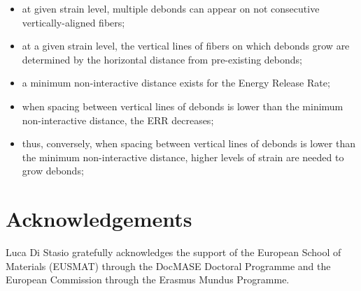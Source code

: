\documentclass[review]{elsarticle}
\begin{document}
\begin{itemize}
\item at given strain level, multiple debonds can appear on not consecutive vertically-aligned fibers;
\item at a given strain level, the vertical lines of fibers on which debonds grow are determined by the horizontal distance from pre-existing debonds;
\item a minimum non-interactive distance exists for the Energy Release Rate;
\item when spacing between vertical lines of debonds is lower than the minimum non-interactive distance, the ERR decreases;
\item thus, conversely, when spacing between vertical lines of debonds is lower than the minimum non-interactive distance, higher levels of strain are needed to grow debonds;
\end{itemize}


\section*{Acknowledgements}

Luca Di Stasio gratefully acknowledges the support of the European School of Materials (EUSMAT) through the DocMASE Doctoral Programme and the European Commission through the Erasmus Mundus Programme.


\end{document}

